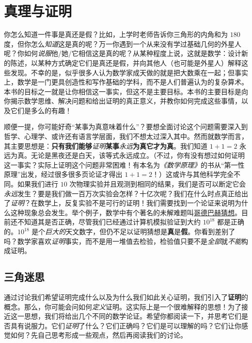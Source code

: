 \section{真理与证明}\label{sec:section1.1}

你怎么知道一件事是真还是假？比如，上学时老师告诉你三角形的内角和为 $180$ 度，但你怎么\emph{知道}这是真的呢？万一你遇到一个从来没有学过基础几何的外星人呢？你如何\emph{说服}他/她/它相信这是真的呢？从某种程度上说，这就是数学：设计新的陈述，以某种方式确定它们是真还是假，并向其他人（也可能是外星人）解释这些发现。不幸的是，似乎很多人认为数学家成天做的就是把大数乘在一起；但事实上，数学是一门更具创造性和写作基础的学科，而不是人们普遍认为的复杂算术。本书的目标之一就是让你相信这一事实，但这不是主要目标。本书的主要目标是向你揭示数学思维、解决问题和给出证明的真正意义，并教你如何完成这些事情，以及它们是多么的有趣！

顺便一提，你可能好奇``某事为真意味着什么''？要想全面讨论这个问题需要深入到哲学、心理学、或许还有语言学层面，我们不想太过深入其中。然而就数学而言，其主要思想是：\textbf{只有我们能够}\emph{证明}\textbf{某事}\emph{永远}\textbf{为真它才为真}。我们知道 $1+1=2$ 永远为真。无论是黑夜还是白天，该等式永远成立。（不过，你有没有想过如何证明这一事实？实际上证明这个问题非常困难！有本名为\emph{《数学原理》}的书从``第一性原理''出发，经过很多很多页论证才得出 $1+1=2$！）这或许与其他科学完全不同。如果我们进行 $10$ 次物理实验并且观测到相同的结果，我们是否可以断定它会\emph{永远}发生？要是我们做一百万次实验会怎样？十亿次呢？我们在什么时点真正给出了\emph{证明}？在数学上，反复实验不是可行的证明！我们需要找到一个论证来说明为什么这种现象总会发生。举个例子，数学中有个著名的未解难题叫\href{https://baike.baidu.com/item/哥德巴赫猜想/72364}{哥德巴赫猜想}。目前还不知道其是否正确，尽管我们已经通过计算机模拟验证到大约 $10^{18}$ 都是正确的。$10^{18}$ 是个\emph{巨大的}天文数字，但仍不足以证明猜想是\textbf{真}是\textbf{假}。你看到差别了吗？数学家喜欢\emph{证明}事实，而不是用一堆值去检验，检验值只要不是\emph{全部}就\emph{不能}构成证明。

\subsection{三角迷思}\label{sec:section1.1.1}

通过讨论我们希望证明完成什么以及为什么我们如此关心证明，我们引入了\textbf{证明}的概念。那么，你可能会问如何\emph{定义}证明。这实际上是一个很难解释的思想！为了接近这一思想，我们将给出几个不同的数学论证。希望你都阅读一下，并思考它们是否具有说服力。它们\emph{证明}了什么？它们正确吗？它们是可以理解的吗？它们让你感觉如何？先自己思考形成一些观点，然后再阅读我们的讨论。

